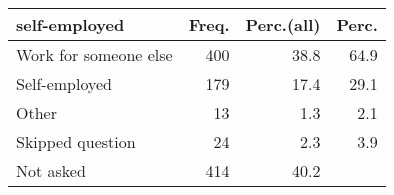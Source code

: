 \begin{table}[ht]
\centering
\begin{tabular}{lrrr}
  \hline
self-employed & Freq. & Perc.(all) & Perc. \\ 
  \hline
Work for someone else & 400 & 38.8 & 64.9 \\ 
  Self-employed & 179 & 17.4 & 29.1 \\ 
  Other & 13 & 1.3 & 2.1 \\ 
  Skipped question & 24 & 2.3 & 3.9 \\ 
  Not asked & 414 & 40.2 &  \\ 
   \hline
\end{tabular}
\end{table}
